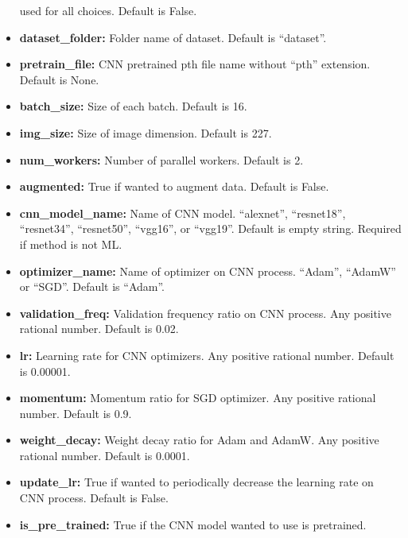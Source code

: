 \begin{itemize}
	used for all choices. Default is False.\\
	\item
	\textbf{dataset\_folder:} Folder name of dataset. Default is ``dataset''.\\
	\item
	\textbf{pretrain\_file:} CNN pretrained pth file name without ``pth''
	extension. Default is None.\\
	\item
	\textbf{batch\_size:} Size of each batch. Default is 16.\\
	\item
	\textbf{img\_size:} Size of image dimension. Default is 227.\\
	\item
	\textbf{num\_workers:} Number of parallel workers. Default is 2.\\
	\item
	\textbf{augmented:} True if wanted to augment data. Default is False.\\
	\item
	\textbf{cnn\_model\_name:} Name of CNN model. ``alexnet'', ``resnet18'',
	``resnet34'', ``resnet50'', ``vgg16'', or ``vgg19''. Default is empty
	string. Required if method is not ML.\\
	\item
	\textbf{optimizer\_name:} Name of optimizer on CNN process. ``Adam'', ``AdamW''
	or ``SGD''. Default is ``Adam''.\\
	\item
	\textbf{validation\_freq:} Validation frequency ratio on CNN process. Any
	positive rational number. Default is 0.02.\\
	\item
	\textbf{lr:} Learning rate for CNN optimizers. Any positive rational number.
	Default is 0.00001.\\
	\item
	\textbf{momentum:} Momentum ratio for SGD optimizer. Any positive rational
	number. Default is 0.9.\\
	\item
	\textbf{weight\_decay:} Weight decay ratio for Adam and AdamW. Any positive
	rational number. Default is 0.0001.\\
	\item
	\textbf{update\_lr:} True if wanted to periodically decrease the learning rate
	on CNN process. Default is False.\\
	\item
	\textbf{is\_pre\_trained:} True if the CNN model wanted to use is pretrained.

\end{itemize}
